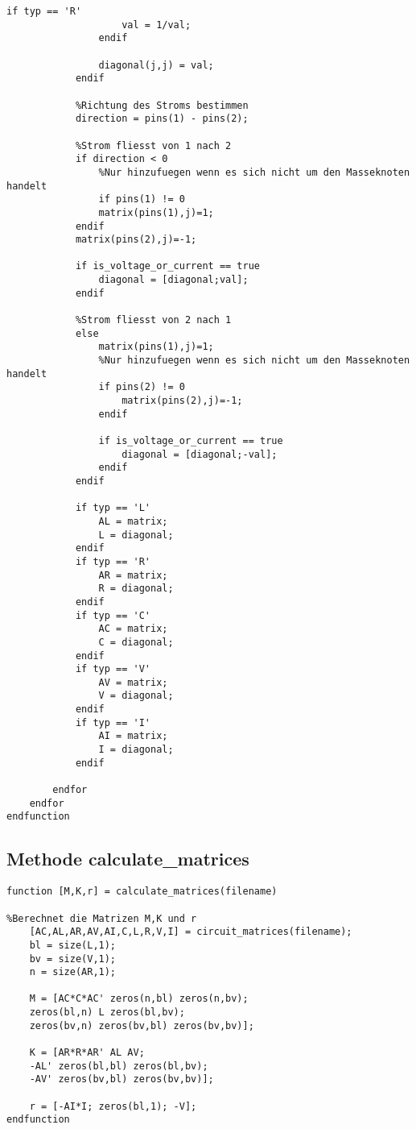 \begin{lstlisting}[caption={Methode \texttt{circuit\_matrices} in Octave}, label=circuit_matrices]
				if typ == 'R'
					val = 1/val;
				endif
			
				diagonal(j,j) = val;
			endif
			
			%Richtung des Stroms bestimmen
			direction = pins(1) - pins(2);
			
			%Strom fliesst von 1 nach 2
			if direction < 0
				%Nur hinzufuegen wenn es sich nicht um den Masseknoten handelt
				if pins(1) != 0
				matrix(pins(1),j)=1;
			endif
			matrix(pins(2),j)=-1;
			
			if is_voltage_or_current == true
				diagonal = [diagonal;val];
			endif
			
			%Strom fliesst von 2 nach 1
			else
				matrix(pins(1),j)=1;
				%Nur hinzufuegen wenn es sich nicht um den Masseknoten handelt
				if pins(2) != 0
					matrix(pins(2),j)=-1;
				endif
			
				if is_voltage_or_current == true
					diagonal = [diagonal;-val];
				endif
			endif
			
			if typ == 'L'
				AL = matrix;
				L = diagonal;
			endif 
			if typ == 'R'
				AR = matrix;
				R = diagonal;
			endif  
			if typ == 'C'
				AC = matrix;
				C = diagonal;
			endif  
			if typ == 'V'
				AV = matrix;
				V = diagonal;
			endif 
			if typ == 'I'
				AI = matrix;
				I = diagonal;  
			endif
		
		endfor
	endfor
endfunction
\end{lstlisting}
\subsection*{Methode calculate\_matrices}
\begin{lstlisting}[caption={Methode \texttt{calculate\_matrices} in Octave}, label=calculate_matrices]
function [M,K,r] = calculate_matrices(filename)
	
%Berechnet die Matrizen M,K und r  
	[AC,AL,AR,AV,AI,C,L,R,V,I] = circuit_matrices(filename);
	bl = size(L,1);
	bv = size(V,1);
	n = size(AR,1);
	
	M = [AC*C*AC' zeros(n,bl) zeros(n,bv);
	zeros(bl,n) L zeros(bl,bv);
	zeros(bv,n) zeros(bv,bl) zeros(bv,bv)];
	
	K = [AR*R*AR' AL AV;
	-AL' zeros(bl,bl) zeros(bl,bv);
	-AV' zeros(bv,bl) zeros(bv,bv)];
	
	r = [-AI*I; zeros(bl,1); -V];
endfunction
\end{lstlisting}
